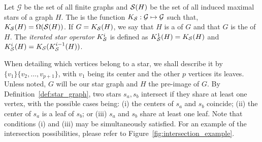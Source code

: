 \begin{definition}\label{def:star_graph}
    Let $\mathcal{G}$ be the set of all finite graphs and $\mathcal{S}(H)$ be the set of all induced maximal stars of a graph $H$. The  is the function $K_{\mathcal{S}} : \mathcal{G} \mapsto \mathcal{G}$ such that, $K_{\mathcal{S}}(H) = \Omega(\mathcal{S}(H))$.
    If $G = K_{\mathcal{S}}(H)$, we say that $H$ is a  of $G$ and that $G$ is the  of $H$.
    The \textit{iterated star operator} $K_{\mathcal{S}}^i$ is defined as $K_{\mathcal{S}}^1(H) = K_{\mathcal{S}}(H)$ and $K_{\mathcal{S}}^i(H) = K_{\mathcal{S}}(K_{\mathcal{S}}^{i-1}(H))$.
\end{definition}

When detailing which vertices belong to a star, we shall describe it by $\{v_1\}\{v_2, \dots, v_{p+1}\}$, with $v_1$ being its center and the other $p$ vertices its leaves.
Unless noted, $G$ will be our star graph and $H$ the pre-image of $G$.%
By Definition~\ref{def:star_graph}, two stars $s_a,s_b$ intersect if they share at least one vertex, with the possible cases being: (i) the centers of $s_a$ and $s_b$ coincide; (ii) the center of $s_a$ is a leaf of $s_b$; or (iii) $s_a$ and $s_b$ share at least one leaf.
Note that conditions (i) and (iii) may be simultaneously satisfied.
For an example of the intersection possibilities, please refer to Figure~\ref{fig:intersection_example}.



